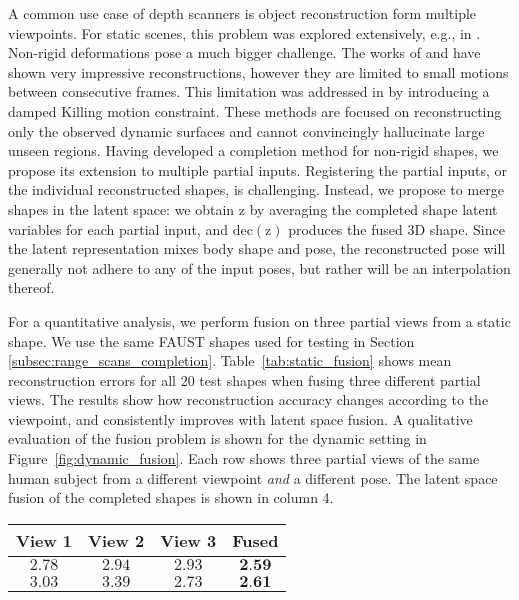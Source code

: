 \documentclass[10pt,twocolumn,letterpaper]{article}
\newcommand{\orlit}[1]{{\color{red}[[orlit: #1]]}}
\newcommand{\bb}[1]{\bm{\mathrm{#1}}}
\begin{document}
A common use case of depth scanners is object reconstruction form multiple viewpoints. For static scenes, this problem was explored extensively, e.g., in \cite{newcombe2011kinectfusion,niessner2013real,endres2012evaluation}. Non-rigid deformations pose a much bigger challenge. The works of \cite{newcombe2015dynamicfusion} and \cite{innmann2016volumedeform} have shown very impressive reconstructions, however they are limited to small motions between consecutive frames. This limitation was addressed in \cite{slavcheva2017killingfusion} by introducing a damped Killing motion constraint. These methods are focused on reconstructing only the observed dynamic surfaces and cannot convincingly hallucinate large unseen regions. 
Having developed a completion method for non-rigid shapes, we propose its extension to multiple partial inputs. Registering the partial inputs, or the individual reconstructed shapes, is challenging. Instead, we propose to merge shapes in the latent space: we obtain $\bb{z}$ by averaging the completed shape latent variables for each partial input, and $\mathrm{dec}(\bb{z})$ produces the fused 3D shape. Since the latent representation mixes body shape and pose, the reconstructed pose will generally not adhere to any of the input poses, but rather will be an interpolation thereof. 

For a quantitative analysis, we perform fusion on three partial views from a static shape. We use the same FAUST shapes used for testing in Section \ref{subsec:range_scans_completion}. Table~\ref{tab:static_fusion} shows mean reconstruction errors for all $20$ test shapes when fusing three different partial views. The results show how reconstruction accuracy changes according to the viewpoint, and consistently improves with latent space fusion. A qualitative evaluation of the fusion problem is shown for the dynamic setting in Figure~\ref{fig:dynamic_fusion}. Each row shows three partial views of the same human subject from a different viewpoint \emph{and} a different pose. The latent space fusion of the completed shapes is shown in column 4. %
\centering
\small
\begin{tabular}{ c c c c }
    \hline\hline
     View 1 & View 2 & View 3 & Fused  \\ \hline  
     $2.78$ & $2.94$ & $2.93$ & $\textbf{2.59}$ \\
     $3.03$ & $3.39$ & $2.73$ & $\textbf{2.61}$ \\ 
     \hline \hline 
\end{tabular}   
  \vspace{2mm}
\end{document}
